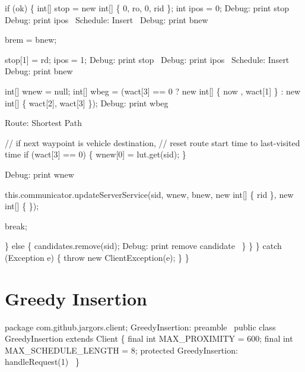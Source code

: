       if (ok) \{
        int[] stop = new int[] \{ 0, ro, 0, rid \};
        int ipos = 0;
        \LA{}Debug: print stop~{\nwtagstyle{}}\RA{}
        \LA{}Debug: print ipos~{\nwtagstyle{}}\RA{}
        \LA{}Schedule: Insert~{\nwtagstyle{}}\RA{}
        \LA{}Debug: print bnew~{\nwtagstyle{}}\RA{}

        brem = bnew;

        stop[1] = rd;
        ipos = 1;
        \LA{}Debug: print stop~{\nwtagstyle{}}\RA{}
        \LA{}Debug: print ipos~{\nwtagstyle{}}\RA{}
        \LA{}Schedule: Insert~{\nwtagstyle{}}\RA{}
        \LA{}Debug: print bnew~{\nwtagstyle{}}\RA{}

        int[] wnew = null;
        int[] wbeg = (wact[3] == 0
            ? new int[] \{ now    , wact[1] \}
            : new int[] \{ wact[2], wact[3] \});
        \LA{}Debug: print wbeg~{\nwtagstyle{}}\RA{}

        \LA{}Route: Shortest Path~{\nwtagstyle{}}\RA{}

        // if next waypoint is vehicle destination,
        // reset route start time to last-visited time
        if (wact[3] == 0) \{
          wnew[0] = lut.get(sid);
        \}

        \LA{}Debug: print wnew~{\nwtagstyle{}}\RA{}

        this.communicator.updateServerService(sid, wnew, bnew,
            new int[] \{ rid \}, new int[] \{ \});

        break;

      \} else \{
        candidates.remove(sid);
        \LA{}Debug: print remove candidate~{\nwtagstyle{}}\RA{}
      \}
    \}
  \} catch (Exception e) \{
    throw new ClientException(e);
  \}
\}
\nwendcode{}\nwdocspar

\section{Greedy Insertion}

\nwenddocs{}\endmoddef\nwstartdeflinemarkup\nwenddeflinemarkup
package com.github.jargors.client;
\LA{}GreedyInsertion: preamble~{\nwtagstyle{}}\RA{}
public class GreedyInsertion extends Client \{
  final int MAX_PROXIMITY = 600;
  final int MAX_SCHEDULE_LENGTH = 8;
  protected \LA{}GreedyInsertion: handleRequest(1)~{\nwtagstyle{}}\RA{}
\}
\nwendcode{}\nwdocspar

